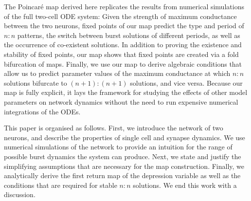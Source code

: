 \documentclass[utf8]{frontiersFPHY} %
\begin{document}
The Poincaré map derived here replicates the results from numerical simulations of the
full two-cell ODE system: Given the strength of maximum conductance between the two
neurons, fixed points of our map predict the type and period of $n:n$ patterns, the switch
between burst solutions of different periods, as well as the occurrence of co-existent
solutions.
In addition to proving the existence and stability of fixed points, our map shows that fixed points are created via a fold bifurcation of maps.
Finally, we use our map to derive algebraic conditions that allow us to predict parameter values of the maximum conductance at which $n:n$ solutions bifurcate to $(n+1):(n+1)$ solutions, and vice versa.
Because our map is fully explicit, it lays the framework for studying the effects of other model parameters on network dynamics without the need to run expensive numerical integrations of the ODEs.

This paper is organised as follows.
First, we introduce the network of two neurons, and describe the properties of single cell and synapse dynamics.
We use numerical simulations of the network to provide an intuition for the range of possible burst dynamics the system can produce.
Next, we state and justify the simplifying assumptions that are necessary for the map construction.
Finally, we analytically derive the first return map of the depression variable as well as the conditions that are required for stable $n:n$ solutions.
We end this work with a discussion.
\end{document}
